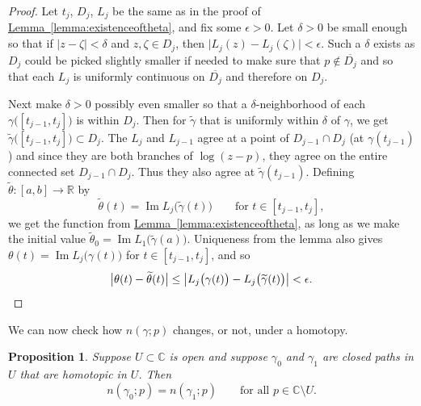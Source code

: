\documentclass[12pt,openany]{book}
\renewcommand{\Im}{\operatorname{Im}}
\newcommand{\sabs}[1]{\lvert {#1} \rvert}
\newcommand{\babs}[1]{\bigl\lvert {#1} \bigr\rvert}
\newcommand{\C}{{\mathbb{C}}}
\newcommand{\R}{{\mathbb{R}}}
\theoremstyle{plain}
\newtheorem{prop}[thm]{Proposition}
\theoremstyle{remark}
\theoremstyle{definition}
\theoremstyle{exercise}
\theoremstyle{example}
\newcommand{\lemmaref}[1]{\hyperref[#1]{Lemma~\ref*{#1}}}
\begin{document}
\begin{proof}
Let $t_j$, $D_j$, $L_j$ be the same as in the proof of
\lemmaref{lemma:existenceoftheta}, and fix some $\epsilon > 0$.
Let $\delta > 0$ be small enough so that if $\sabs{z-\zeta}
< \delta$ and $z,\zeta \in D_j$, then $\sabs{L_j(z)-L_j(\zeta)} < \epsilon$.
Such a $\delta$ exists as $D_j$ could be picked slightly smaller if needed
to make sure that $p \notin \overline{D_j}$ and so that each $L_j$
is uniformly continuous on $\overline{D_j}$ and therefore on $D_j$.

Next make $\delta > 0$ possibly even smaller so that a $\delta$-neighborhood of each
$\gamma\bigl([t_{j-1},t_j]\bigr)$ is within $D_j$.  Then
for $\widetilde{\gamma}$ that is uniformly within $\delta$ of $\gamma$, we
get
$\widetilde{\gamma}\bigl([t_{j-1},t_j]\bigr) \subset D_j$.
The $L_j$ and $L_{j-1}$ agree at a point of $D_{j-1} \cap D_j$ (at
$\gamma(t_{j-1})$) and since they are both branches of $\log (z-p)$, they
agree on the entire connected set $D_{j-1} \cap D_j$.  Thus they also
agree at $\widetilde{\gamma}(t_{j-1})$.
Defining $\widetilde{\theta} \colon [a,b] \to \R$ by
\begin{equation*}
\widetilde{\theta}(t)
=
\Im L_j\bigl(\widetilde{\gamma}(t)\bigr)
\qquad
\text{for } t \in [t_{j-1},t_j] ,
\end{equation*}
we get the function from \lemmaref{lemma:existenceoftheta},
as long as we make the initial value
$\widetilde{\theta}_0 = \Im L_1\bigl(\widetilde{\gamma}(a)\bigr)$.
Uniqueness from the lemma also gives
$\theta(t) = \Im L_j\bigl(\gamma(t)\bigr)$
for $t \in [t_{j-1},t_j]$, and so
\begin{equation*}
\babs{\theta(t) - \widetilde{\theta}(t)}
\leq
\babs{
L_j\bigl(\gamma(t)\bigr)
-
L_j\bigl(\widetilde{\gamma}(t)\bigr)
}
< \epsilon. \qedhere
\end{equation*}
\end{proof}

We can now check how $n(\gamma;p)$ changes, or not, under a homotopy.

\begin{prop} \label{prop:homotopicmeanshomologous}
Suppose $U \subset \C$ is open and suppose $\gamma_0$ and $\gamma_1$ are closed
paths in $U$ that are homotopic in $U$.  Then
\begin{equation*}
n(\gamma_0;p) = n(\gamma_1;p) \qquad \text{for all } p \in \C \setminus U .
\end{equation*}
\end{prop}
\end{document}
